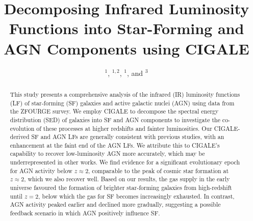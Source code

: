 


\title{Decomposing Infrared Luminosity Functions into Star-Forming and AGN Components using CIGALE}

\author{ $^{1}$,  
         $^{1,2}$,
         $^{1}$,
        and  $^{3}$}





\begin{abstract}
    This study presents a comprehensive analysis of the infrared (IR) luminosity functions (LF) of star-forming (SF) galaxies and active galactic nuclei (AGN) using data from the ZFOURGE survey. We employ CIGALE to decompose the spectral energy distribution (SED) of galaxies into SF and AGN components to investigate the co-evolution of these processes at higher redshifts and fainter luminosities. Our CIGALE-derived SF and AGN LFs are generally consistent with previous studies, with an enhancement at the faint end of the AGN LFs. We attribute this to CIGALE's capability to recover low-luminosity AGN more accurately, which may be underrepresented in other works. We find evidence for a significant evolutionary epoch for AGN activity below $z \approx 2$, comparable to the peak of cosmic star formation at $z \approx 2$, which we also recover well. Based on our results, the gas supply in the early universe favoured the formation of brighter star-forming galaxies from high-redshift until $z=2$, below which the gas for SF becomes increasingly exhausted. In contrast, AGN activity peaked earlier and declined more gradually, suggesting a possible feedback scenario in which AGN positively influence SF. 
\end{abstract}

